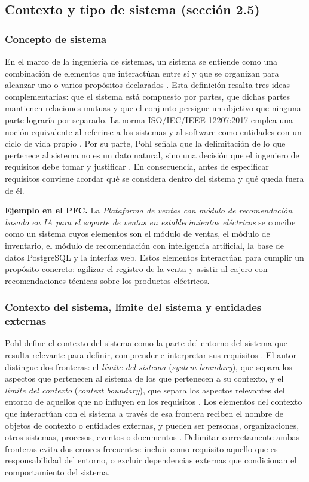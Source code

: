 \documentclass[onecolumn,12pt]{IEEEtran}
\begin{document}
\subsection{Contexto y tipo de sistema (secci\'on 2.5)}

\subsubsection{Concepto de sistema}
En el marco de la ingenier\'ia de sistemas, un sistema se entiende como una combinaci\'on de elementos que interact\'uan entre s\'i y que se organizan para alcanzar uno o varios prop\'ositos declarados \cite{iso15288}. Esta definici\'on resalta tres ideas complementarias: que el sistema est\'a compuesto por partes, que dichas partes mantienen relaciones mutuas y que el conjunto persigue un objetivo que ninguna parte lograr\'ia por separado. La norma ISO/IEC/IEEE 12207:2017 emplea una noci\'on equivalente al referirse a los sistemas y al software como entidades con un ciclo de vida propio \cite{iso12207}. Por su parte, Pohl se\~nala que la delimitaci\'on de lo que pertenece al sistema no es un dato natural, sino una decisi\'on que el ingeniero de requisitos debe tomar y justificar \cite{pohl2025}. En consecuencia, antes de especificar requisitos conviene acordar qu\'e se considera dentro del sistema y qu\'e queda fuera de \'el.

\textbf{Ejemplo en el PFC.} La \emph{Plataforma de ventas con m\'odulo de recomendaci\'on basado en IA para el soporte de ventas en establecimientos el\'ectricos} se concibe como un sistema cuyos elementos son el m\'odulo de ventas, el m\'odulo de inventario, el m\'odulo de recomendaci\'on con inteligencia artificial, la base de datos PostgreSQL y la interfaz web. Estos elementos interact\'uan para cumplir un prop\'osito concreto: agilizar el registro de la venta y asistir al cajero con recomendaciones t\'ecnicas sobre los productos el\'ectricos.

\subsubsection{Contexto del sistema, l\'imite del sistema y entidades externas}
Pohl define el contexto del sistema como la parte del entorno del sistema que resulta relevante para definir, comprender e interpretar sus requisitos \cite{pohl2025}. El autor distingue dos fronteras: el \emph{l\'imite del sistema} (\emph{system boundary}), que separa los aspectos que pertenecen al sistema de los que pertenecen a su contexto, y el \emph{l\'imite del contexto} (\emph{context boundary}), que separa los aspectos relevantes del entorno de aquellos que no influyen en los requisitos \cite{pohl2025}. Los elementos del contexto que interact\'uan con el sistema a trav\'es de esa frontera reciben el nombre de objetos de contexto o entidades externas, y pueden ser personas, organizaciones, otros sistemas, procesos, eventos o documentos \cite{pohl2025,iso15288}. Delimitar correctamente ambas fronteras evita dos errores frecuentes: incluir como requisito aquello que es responsabilidad del entorno, o excluir dependencias externas que condicionan el comportamiento del sistema.
\end{document}

